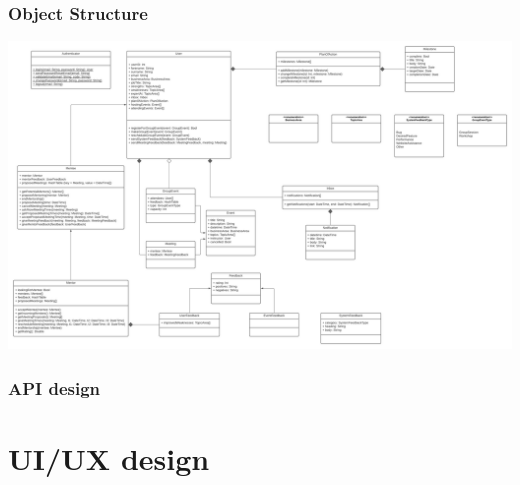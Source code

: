 \documentclass[10pt]{article}
\begin{document}
\subsubsection{Object Structure}
\includegraphics[scale=0.32]{Objects}

\subsubsection{API design}

\section{UI/UX design}
\end{document}
